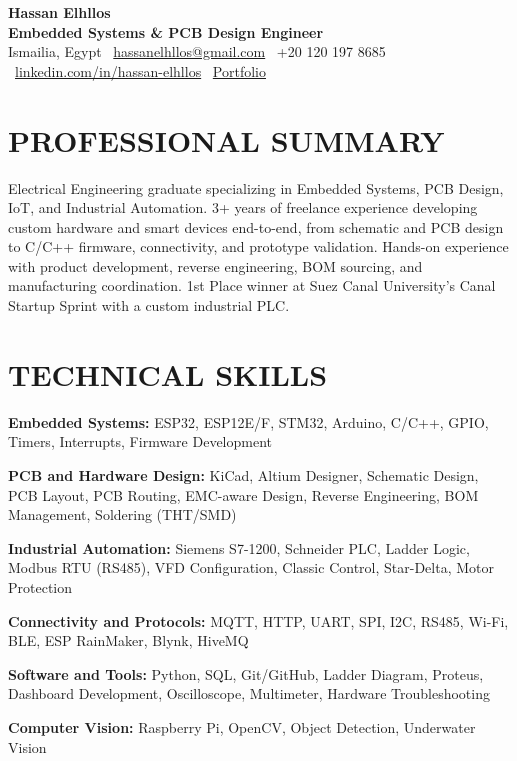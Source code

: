 \documentclass[10pt,a4paper]{article}
\begin{document}
\begin{center}
  {\fontsize{22}{26}\selectfont\bfseries Hassan Elhllos}\\[2pt]
  {\fontsize{11.5}{14}\selectfont\bfseries\color{accent}Embedded Systems \& PCB Design Engineer}\\[2pt]
  {\color{muted}\small Ismailia, Egypt \textbar\ 
  \href{mailto:hassanelhllos@gmail.com}{hassanelhllos@gmail.com} \textbar\ 
  +20 120 197 8685 \textbar\ 
  \href{https://www.linkedin.com/in/hassan-elhllos-664188255/}{linkedin.com/in/hassan-elhllos} \textbar\ \href{https://hassanelhllos2020.github.io/portfolio-v2/}{Portfolio}}
\end{center}

\vspace{1pt}
{\color{divider}{\rule{\linewidth}{1.4pt}}}\vspace{3pt}

\section*{PROFESSIONAL SUMMARY}
Electrical Engineering graduate specializing in Embedded Systems, PCB Design, IoT, and Industrial Automation. 3+ years of freelance experience developing custom hardware and smart devices end-to-end, from schematic and PCB design to C/C++ firmware, connectivity, and prototype validation. Hands-on experience with product development, reverse engineering, BOM sourcing, and manufacturing coordination. 1st Place winner at Suez Canal University's Canal Startup Sprint with a custom industrial PLC.

\section*{TECHNICAL SKILLS}
\textbf{Embedded Systems:} ESP32, ESP12E/F, STM32, Arduino, C/C++, GPIO, Timers, Interrupts, Firmware Development\par
\textbf{PCB and Hardware Design:} KiCad, Altium Designer, Schematic Design, PCB Layout, PCB Routing, EMC-aware Design, Reverse Engineering, BOM Management, Soldering (THT/SMD)\par
\textbf{Industrial Automation:} Siemens S7-1200, Schneider PLC, Ladder Logic, Modbus RTU (RS485), VFD Configuration, Classic Control, Star-Delta, Motor Protection\par
\textbf{Connectivity and Protocols:} MQTT, HTTP, UART, SPI, I2C, RS485, Wi-Fi, BLE, ESP RainMaker, Blynk, HiveMQ\par
\textbf{Software and Tools:} Python, SQL, Git/GitHub, Ladder Diagram, Proteus, Dashboard Development, Oscilloscope, Multimeter, Hardware Troubleshooting\par
\textbf{Computer Vision:} Raspberry Pi, OpenCV, Object Detection, Underwater Vision
\end{document}
